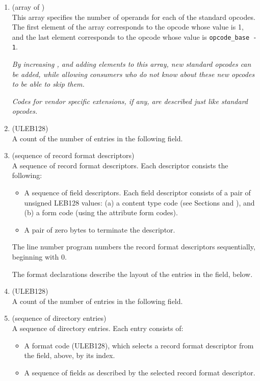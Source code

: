 \begin{enumerate}[1. ]
\item \HFNstandardopcodelengths{} (array of \HFTubyte) \\
This array specifies the number of  operands for each
of the standard opcodes. The first element of the array
corresponds to the opcode whose value is 1, and the last
element corresponds to the opcode whose value 
is \texttt{opcode\_base - 1}.

\textit{By increasing \HFNopcodebase{}, and adding elements to this array,
new standard opcodes can be added, while allowing consumers who
do not know about these new opcodes to be able to skip them.}

\textit{Codes for vendor specific extensions, if any, are described
just like standard opcodes.}

\bb
\item \HFNdirectoryformatcount{} (ULEB128) \\
A count of the number of entries in the
following \HFNdirectoryformattable{} field.
\eb

\bb
\item \HFNdirectoryformattable{} (sequence of record format descriptors) \\
A sequence of record format descriptors.
Each descriptor consists the following:
\begin{itemize}
\setlength{\itemsep}{0em}
\item A sequence of field descriptors. Each field descriptor consists
of a pair of unsigned LEB128 values: (a) a content type code (see 
Sections  and
), and 
(b) a form code (using the attribute form codes).
\item A pair of zero bytes to terminate the descriptor.
\end{itemize}

The line number program numbers the record format descriptors
sequentially, beginning with 0.

The format declarations describe the layout of the entries
in the \HFNdirectories{} field, below.
\eb

\item \HFNdirectoriescount{} (ULEB128) \\
A count of the number of entries 
\db
in the following \HFNdirectories{} field.

\bb    
\item \HFNdirectories{} (sequence of directory entries) \\
A sequence of directory entries. Each entry consists of:
\begin{itemize}
\setlength{\itemsep}{0em}
\item A format code (ULEB128), which selects a record format 
descriptor from the \HFNdirectoryformattable{} field, above, 
by its index.
\item A sequence of fields as described by the selected record 
format descriptor.
\end{itemize}


\end{enumerate}
